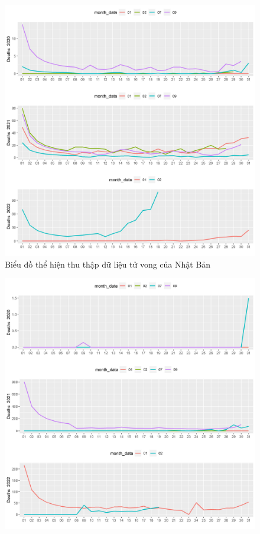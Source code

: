 \documentclass[a4paper]{article}
\theoremstyle{definition}
\begin{document}
\begin{enumerate}[i)]
\begin{enumerate}[1)]
\begin{figure}[htp]
		    \includegraphics[scale = 0.7]{Images/VI/vi2 Japan .jpeg}
		    \caption{Biểu đồ thể hiện thu thập dữ liệu tử vong của Nhật Bản}
		    \label{fig:my_label}
		\end{figure}
		\begin{figure}[htp]
		    \centering
		    \includegraphics[scale = 0.7]{Images/VI/vi2 Vietnam .jpeg} 

\end{figure}
\end{enumerate}
\end{enumerate}
\end{document}
